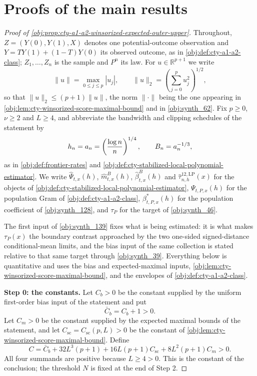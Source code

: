 \documentclass[11pt]{article}
\begin{document}
\section{Proofs of the main results}\label{sec:deferred-proofs}

\begin{proof}[Proof of \cref{obj:prop:cty-a1-a2-winsorized-expected-outer-upper}]
Throughout, \(Z=(Y(0),Y(1),X)\) denotes one potential-outcome observation and \(Y=TY(1)+(1-T)Y(0)\) its observed outcome, as in \cref{obj:def:cty-a1-a2-class}; \(Z_1,\ldots,Z_n\) is the sample and \(P^n\) its law.  For \(u\in\mathbb R^{p+1}\) we write
\[
\lVert u\rVert=\max_{0\leq j\leq p}|u_j|,
\qquad
\lVert u\rVert_2=\left(\sum_{j=0}^p u_j^2\right)^{1/2},
\]
so that \(\lVert u\rVert_2\leq(p+1)\lVert u\rVert\), the norm \(\lVert\cdot\rVert\) being the one appearing in \cref{obj:lem:cty-winsorized-score-maximal-bound} and in \cref{obj:synth_62}.  Fix \(p\geq0\), \(\nu\geq2\) and \(L\geq4\), and abbreviate the bandwidth and clipping schedules of the statement by
\[
h_n=a_n=\left({\log n\over n}\right)^{1/4},
\qquad
B_n=a_n^{-1/3},
\]
as in \cref{obj:def:frontier-rates} and \cref{obj:def:cty-stabilized-local-polynomial-estimator}.  We write \(\widehat\Psi_{t,x}(h)\), \(\widehat m^B_{t,x}(h)\), \(\widehat\beta^B_{t,x}(h)\) and \(\widehat\tau^{12,\mathrm{LP}}_{n,h}(x)\) for the objects of \cref{obj:def:cty-stabilized-local-polynomial-estimator}, \(\Psi_{t,P,x}(h)\) for the population Gram of \cref{obj:def:cty-a1-a2-class}, \(\beta^*_{t,P,x}(h)\) for the population coefficient of \cref{obj:synth_128}, and \(\tau_P\) for the target of \cref{obj:synth_46}.

The first input of \cref{obj:synth_139} fixes what is being estimated: it is what makes \(\tau_P(x)\) the boundary contrast approached by the two one-sided signed-distance conditional-mean limits, and the bias input of the same collection is stated relative to that same target through \cref{obj:synth_39}.  Everything below is quantitative and uses the bias and expected-maximal inputs, \cref{obj:lem:cty-winsorized-score-maximal-bound}, and the envelopes of \cref{obj:def:cty-a1-a2-class}.

\textbf{Step 0: the constants.}  Let \(C_b>0\) be the constant supplied by the uniform first-order bias input of the statement and put
\[
\bar C_b=C_b+1>0 .
\]
Let \(C_m>0\) be the constant supplied by the expected maximal bounds of the statement, and let \(C_{\mathrm{sc}}=C_{\mathrm{sc}}(p,L)>0\) be the constant of \cref{obj:lem:cty-winsorized-score-maximal-bound}.  Define
\[
C
=
\bar C_b+32L^3(p+1)+16L(p+1)C_{\mathrm{sc}}+8L^2(p+1)C_m
>0 .
\]
All four summands are positive because \(L\geq4>0\).  This is the constant of the conclusion; the threshold \(N\) is fixed at the end of Step 2.


\end{proof}
\end{document}
